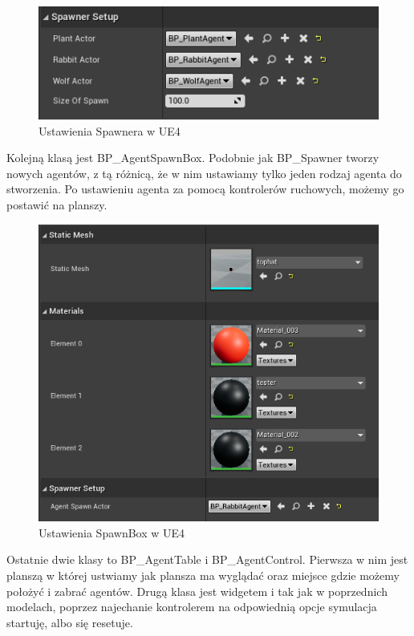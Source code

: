 \documentclass[a4paper,12pt,reqno]{article}
\begin{document}
\begin{figure}[H]%
\centering
\includegraphics[width=0.6\columnwidth]{graphics//agent/BP_SpawnerAgent.png}
\caption{Ustawienia Spawnera w UE4 
\label{BPExample}}%
%
\qquad
\end{figure} 

Kolejną klasą jest BP\_AgentSpawnBox. Podobnie jak BP\_Spawner tworzy nowych agentów, z tą różnicą, że w nim ustawiamy tylko jeden rodzaj agenta do stworzenia. Po ustawieniu agenta za pomocą kontrolerów ruchowych, możemy go postawić na planszy.

\begin{figure}[H]%
\centering
\includegraphics[width=0.50\columnwidth]{graphics//agent/BP_AgentSpawnBox.png}
\caption{Ustawienia SpawnBox w UE4 
\label{BPExample}}%
%
\qquad
\end{figure} 

Ostatnie dwie klasy to BP\_AgentTable i BP\_AgentControl. Pierwsza w nim jest planszą w której ustwiamy jak plansza ma wyglądać oraz miejsce gdzie możemy położyć i zabrać agentów. Drugą klasa jest widgetem i tak jak w poprzednich modelach, poprzez najechanie kontrolerem na odpowiednią opcje symulacja startuję, albo się resetuje.
\end{document}
